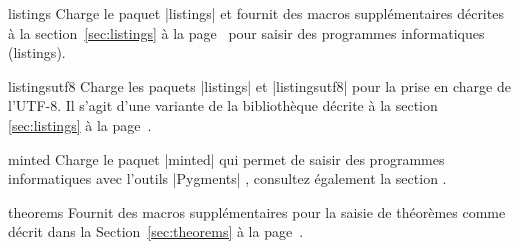 {\begin{docTcbKey}[library]{listings}{}{}
  Charge le paquet |listings| \cite{hoffmann:listings} et fournit des macros supplémentaires
  décrites à la section~\ref{sec:listings}
  à la page~\pageref{sec:listings} pour saisir des programmes informatiques (listings).
\end{docTcbKey}


\begin{docTcbKey}[library]{listingsutf8}{}{}
  Charge les paquets  |listings| \cite{hoffmann:listings} et
  |listingsutf8| \cite{oberdiek:listingsutf8} pour la prise en charge de l'UTF-8.
  Il s'agit d'une variante de la bibliothèque 
  décrite à la section \ref{sec:listings} à la page~\pageref{sec:listings}.
\end{docTcbKey}


\begin{docTcbKey}[library]{minted}{}{}
  Charge le paquet |minted| \cite{poore:minted} qui permet de saisir des programmes
  informatiques avec l'outils |Pygments| \cite{pygments:web},
  consultez également la section .
\end{docTcbKey}


\begin{docTcbKey}[library]{theorems}{}{}
  Fournit des macros supplémentaires pour la saisie de
  théorèmes comme décrit dans la Section~\ref{sec:theorems}
  à la page~\pageref{sec:theorems}.
\end{docTcbKey}

}
